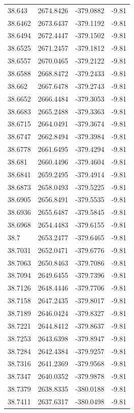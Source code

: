 \begin{table}[H]
\begin{tabular}{llll}
38.643 & 2674.8426 & -379.0882 & -9.81 \\
38.6462 & 2673.6437 & -379.1192 & -9.81 \\
38.6494 & 2672.4447 & -379.1502 & -9.81 \\
38.6525 & 2671.2457 & -379.1812 & -9.81 \\
38.6557 & 2670.0465 & -379.2122 & -9.81 \\
38.6588 & 2668.8472 & -379.2433 & -9.81 \\
38.662 & 2667.6478 & -379.2743 & -9.81 \\
38.6652 & 2666.4484 & -379.3053 & -9.81 \\
38.6683 & 2665.2488 & -379.3363 & -9.81 \\
38.6715 & 2664.0491 & -379.3674 & -9.81 \\
38.6747 & 2662.8494 & -379.3984 & -9.81 \\
38.6778 & 2661.6495 & -379.4294 & -9.81 \\
38.681 & 2660.4496 & -379.4604 & -9.81 \\
38.6841 & 2659.2495 & -379.4914 & -9.81 \\
38.6873 & 2658.0493 & -379.5225 & -9.81 \\
38.6905 & 2656.8491 & -379.5535 & -9.81 \\
38.6936 & 2655.6487 & -379.5845 & -9.81 \\
38.6968 & 2654.4483 & -379.6155 & -9.81 \\
38.7 & 2653.2477 & -379.6465 & -9.81 \\
38.7031 & 2652.0471 & -379.6776 & -9.81 \\
38.7063 & 2650.8463 & -379.7086 & -9.81 \\
38.7094 & 2649.6455 & -379.7396 & -9.81 \\
38.7126 & 2648.4446 & -379.7706 & -9.81 \\
38.7158 & 2647.2435 & -379.8017 & -9.81 \\
38.7189 & 2646.0424 & -379.8327 & -9.81 \\
38.7221 & 2644.8412 & -379.8637 & -9.81 \\
38.7253 & 2643.6398 & -379.8947 & -9.81 \\
38.7284 & 2642.4384 & -379.9257 & -9.81 \\
38.7316 & 2641.2369 & -379.9568 & -9.81 \\
38.7347 & 2640.0352 & -379.9878 & -9.81 \\
38.7379 & 2638.8335 & -380.0188 & -9.81 \\
38.7411 & 2637.6317 & -380.0498 & -9.81 \\

\end{tabular}
\end{table}
